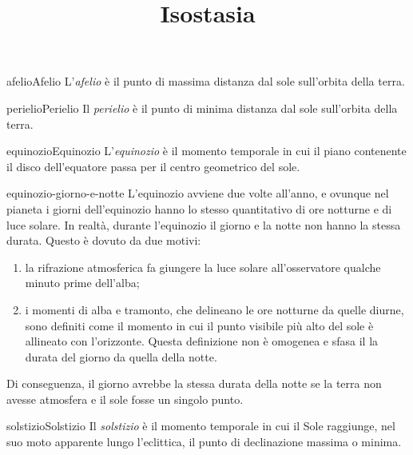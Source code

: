 \documentclass[preview]{standalone}
\begin{document}
\title{Isostasia}
\genpage


\begin{snippetdefinition}{afelio}{Afelio}
    L'\textit{afelio} è il punto di massima distanza dal sole sull'orbita
    della terra.
\end{snippetdefinition}

\begin{snippetdefinition}{perielio}{Perielio}
    Il \textit{perielio} è il punto di minima distanza dal sole sull'orbita
    della terra.
\end{snippetdefinition}


\begin{snippetdefinition}{equinozio}{Equinozio}
    L'\textit{equinozio} è il momento temporale in
    cui il piano contenente il disco dell'equatore
    passa per il centro geometrico del sole.
\end{snippetdefinition}

\begin{snippet}{equinozio-giorno-e-notte}
    L'equinozio avviene due volte all'anno, e ovunque nel pianeta i giorni dell'equinozio hanno lo stesso quantitativo di ore notturne e di luce solare.
    In realtà, durante l'equinozio il giorno e la notte non hanno la stessa durata.
    Questo è dovuto da due motivi:
    \begin{enumerate}
        \item la rifrazione atmosferica fa giungere la luce solare all'osservatore qualche minuto prime dell'alba;
        \item i momenti di alba e tramonto, che delineano le ore notturne da quelle diurne, sono definiti come il momento in cui il punto visibile più alto del sole è allineato con l'orizzonte. Questa definizione non è omogenea e sfasa il la durata del giorno da quella della notte.
    \end{enumerate}
    Di conseguenza, il giorno avrebbe la stessa durata della notte se la terra non avesse atmosfera e il sole fosse un singolo punto.
\end{snippet}

\begin{snippetdefinition}{solstizio}{Solstizio}
    Il \textit{solstizio} è il momento temporale in
    cui il Sole raggiunge, nel suo moto apparente lungo l'eclittica,
    il punto di declinazione massima o minima.
\end{snippetdefinition}
\end{document}
